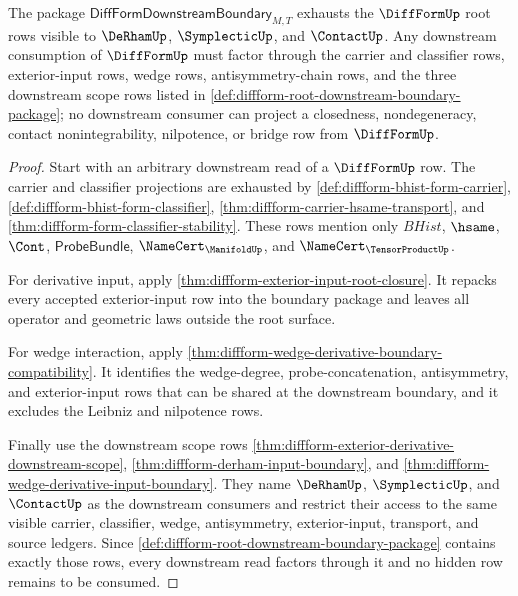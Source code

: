 \begin{theorem}
\label{thm:diffform-downstream-boundary-exhaustion}
The package $\mathsf{DiffFormDownstreamBoundary}_{M,T}$ exhausts the
$\DiffFormUp$ root rows visible to $\DeRhamUp$, $\SymplecticUp$, and
$\ContactUp$. Any downstream consumption of $\DiffFormUp$ must factor through
the carrier and classifier rows, exterior-input rows, wedge rows,
antisymmetry-chain rows, and the three downstream scope rows listed in
\autoref{def:diffform-root-downstream-boundary-package}; no downstream
consumer can project a closedness, nondegeneracy, contact nonintegrability,
nilpotence, or bridge row from $\DiffFormUp$.
\end{theorem}
\begin{proof}
Start with an arbitrary downstream read of a $\DiffFormUp$ row. The carrier
and classifier projections are exhausted by
\autoref{def:diffform-bhist-form-carrier},
\autoref{def:diffform-bhist-form-classifier},
\autoref{thm:diffform-carrier-hsame-transport}, and
\autoref{thm:diffform-form-classifier-stability}. These rows mention only
$BHist$, $\hsame$, $\Cont$, $\mathsf{ProbeBundle}$,
$\NameCert_{\ManifoldUp}$, and $\NameCert_{\TensorProductUp}$.

For derivative input, apply
\autoref{thm:diffform-exterior-input-root-closure}. It repacks every accepted
exterior-input row into the boundary package and leaves all operator and
geometric laws outside the root surface.

For wedge interaction, apply
\autoref{thm:diffform-wedge-derivative-boundary-compatibility}. It identifies
the wedge-degree, probe-concatenation, antisymmetry, and exterior-input rows
that can be shared at the downstream boundary, and it excludes the Leibniz
and nilpotence rows.

Finally use the downstream scope rows
\autoref{thm:diffform-exterior-derivative-downstream-scope},
\autoref{thm:diffform-derham-input-boundary}, and
\autoref{thm:diffform-wedge-derivative-input-boundary}. They name
$\DeRhamUp$, $\SymplecticUp$, and $\ContactUp$ as the downstream consumers
and restrict their access to the same visible carrier, classifier, wedge,
antisymmetry, exterior-input, transport, and source ledgers. Since
\autoref{def:diffform-root-downstream-boundary-package} contains exactly
those rows, every downstream read factors through it and no hidden row remains
to be consumed.
\end{proof}
